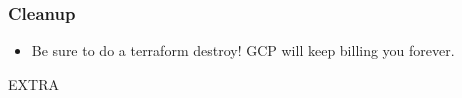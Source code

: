 \documentclass[aspectratio=169]{beamer}
\begin{document}

\begin{frame}
	\frametitle{Cleanup}
	\begin{itemize}
		\item Be sure to do a terraform destroy! GCP will keep billing you forever.
	\end{itemize}
\end{frame}

\begin{frame}
	\Huge \textcolor{dgreen}{EXTRA}
\end{frame}
                                                                       
\end{document}
